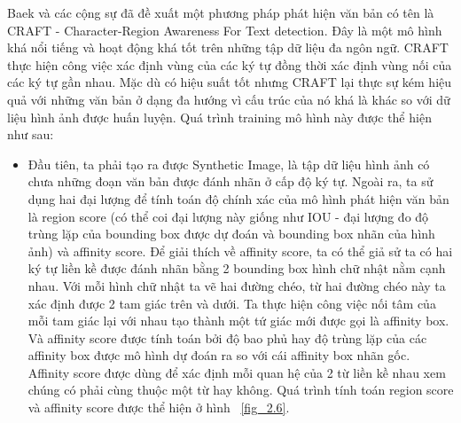Baek và các cộng sự đã đề xuất một phương pháp phát hiện văn bản có tên là CRAFT -
Character-Region Awareness For Text detection. Đây là một mô hình khá nổi tiếng và hoạt
động khá tốt trên những tập dữ liệu đa ngôn ngữ. CRAFT thực hiện công việc xác định vùng
của các ký tự đồng thời xác định vùng nối của các ký tự gần nhau. Mặc dù có hiệu suất tốt
nhưng CRAFT lại thực sự kém hiệu quả với những văn bản ở dạng đa hướng vì cấu trúc
của nó khá là khác so với dữ liệu hình ảnh được huấn luyện. Quá trình training mô hình này
được thể hiện như sau:
\begin{itemize}
    \item Đầu tiên, ta phải tạo ra được Synthetic Image, là tập dữ liệu hình ảnh có chưa
những đoạn văn bản được đánh nhãn ở cấp độ ký tự. Ngoài ra, ta sử dụng hai đại
lượng để tính toán độ chính xác của mô hình phát hiện văn bản là region score (có
thể coi đại lượng này giống như IOU - đại lượng đo độ trùng lặp của bounding box
được dự đoán và bounding box nhãn của hình ảnh) và affinity score. Để giải thích về
affinity score, ta có thể giả sử ta có hai ký tự liền kề được đánh nhãn bằng 2
bounding box hình chữ nhật nằm cạnh nhau. Với mỗi hình chữ nhật ta vẽ hai đường chéo, từ hai đường chéo này ta xác định được 2 tam giác trên và dưới. Ta thực hiện
công việc nối tâm của mỗi tam giác lại với nhau tạo thành một tứ giác mới được gọi
là affinity box. Và affinity score được tính toán bởi độ bao phủ hay độ trùng lặp của
các affinity box được mô hình dự đoán ra so với cái affinity box nhãn gốc. Affinity
score được dùng để xác định mỗi quan hệ của 2 từ liền kề nhau xem chúng có phải
cùng thuộc một từ hay không. Quá trình tính toán region score và affinity score được thể hiện ở hình ~\ref{fig_2.6}.


\end{itemize}
